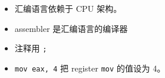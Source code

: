
\begin{issues}
\issueDraft
\end{issues}

\begin{itemize}
\item 汇编语言依赖于 CPU 架构。
\item assembler 是汇编语言的编译器
\item 注释用 \verb|;|
\item \verb|mov eax, 4| 把 register \verb|mov| 的值设为 4。
\end{itemize}
